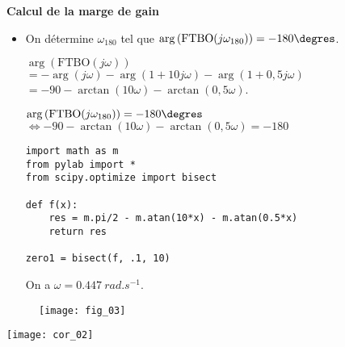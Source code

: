 \ifprof
\begin{corrige}
\textbf{Calcul de la marge de gain}
\begin{itemize}
\item On détermine $\omega_{180}$ tel que $\arg\left(\text{FTBO}(j\omega_{180})\right)=-180\degres$. 

$\arg\left(\text{FTBO}(j\omega)\right) $ $= -\arg\left( j\omega\right)-\arg\left( 1+ 10 j\omega\right)-\arg\left(1+0,5j\omega \right) $ $= - 90 - \arctan \left( 10 \omega \right) - \arctan \left( 0,5 \omega \right)$.

$\arg\left(\text{FTBO}(j\omega_{180})\right)=-180\degres$ 
$\Leftrightarrow - 90 - \arctan \left( 10 \omega \right) - \arctan \left( 0,5 \omega \right) = -180$

\begin{lstlisting}
import math as m
from pylab import *
from scipy.optimize import bisect 

def f(x):                                       
    res = m.pi/2 - m.atan(10*x) - m.atan(0.5*x)
    return res

zero1 = bisect(f, .1, 10)
\end{lstlisting}
On a $\omega=\SI{0,447}{rad.s^{-1}}$.
\end{itemize}

\end{corrige}
\else
\fi






\ifprof
\else
\begin{figure}[h!]
\centering

\texttt{[image: fig\_03]}
\end{figure}
\fi


\ifprof
\begin{center}
\texttt{[image: cor\_02]}
\end{center}
\else
\fi


